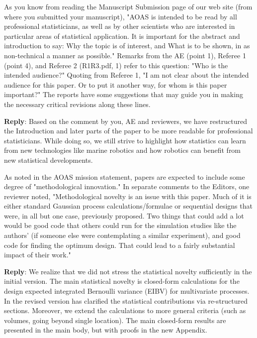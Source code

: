 \documentclass[a4paper]{article}
\newcounter{reviewer}
\def\reply{\textbf{Reply}}
\begin{document}
\vspace{5mm}

As you know from reading the Manuscript Submission page of our
web site (from where you submitted your manuscript), "AOAS is 
intended to be read by all professional statisticians, as well 
as by other scientists who are interested in particular areas 
of statistical application. It is important for the abstract
and introduction to say: Why the topic is of interest, and What 
is to be shown, in as non-technical a manner as possible."
Remarks from the AE (point 1), Referee 1 (point 4), and Referee 2 
(R1R3.pdf, 1) refer to this question: "Who is the intended
audience?"  Quoting from Referee 1, "I am not clear about the 
intended audience for this paper.  Or to put it another way, 
for whom is this paper important?" The reports have some 
suggestions that may guide you in making the necessary critical 
revisions along these lines.  

\reply: Based on the comment by you, AE and reviewers, we have restructured the Introduction and later parts of the paper to be more readable for professional statisticians. While doing so, we still strive to highlight how statistics can learn from new technologies like marine robotics and how robotics can benefit from new statistical developments. 

\vspace{5mm}

As noted in the AOAS mission statement, papers are expected
to include some degree of "methodological innovation."
In separate comments to the Editors, one reviewer noted,
"Methodological novelty is an issue with this paper.  Much of 
it is either standard Gaussian process calculations/formulae 
or sequential designs that were, in all but one case, previously 
proposed. Two things that could add a lot would be good code 
that others could run for the simulation studies like the authors' 
(if someone else were contemplating a similar experiment), and 
good code for finding the optimum design. That could lead to a 
fairly substantial impact of their work."

\reply: We realize that we did not stress the statistical novelty sufficiently in the initial version. The main statistical novelty is closed-form calculations for the design expected integrated Bernoulli variance (EIBV) for multivariate processes. In the revised version has clarified the statistical contributions via re-structured sections. Moreover, we extend the calculations to more general criteria (such as volumes, going beyond single location). The main closed-form results are presented in the main body, but with proofs in the new Appendix.
\end{document}
